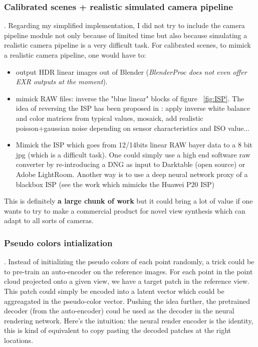 \subsubsection*{Calibrated scenes + realistic simulated camera pipeline}.
\noindent Regarding my simplified implementation, I did not try to include the camera pipeline module not only because of limited time but also because simulating a realistic camera pipeline is a very difficult task.
For calibrated scenes, to mimick a realistic camera pipeline, one would have to:
\begin{itemize}
    \item output HDR linear images out of Blender (\textit{BlenderProc does not even offer EXR outputs at the moment}).
    \item mimick RAW files: inverse the "blue linear" blocks of figure ~\cref*{fig:ISP}. The idea of reversing the ISP has been proposed in \cite{brooks2018unprocessing}: apply inverse white balance and color matrices from typical values, mosaick, add realistic poisson+gaussian noise depending on sensor characteristics and ISO value...
    \item Mimick the ISP which goes from 12/14bits linear RAW bayer data to a 8 bit jpg (which is a difficult task). One could simply use a high end software raw converter by re-introducing a DNG as input to Darktable (open source) or Adobe LightRoom. Another way is to use a deep neural network proxy of a blackbox ISP (see the work \cite{ignatov2020replacing} which mimicks the Huawei P20 ISP)
\end{itemize}
This is definitely \textbf{a large chunk of work} but it could bring a lot of value if one wants to try to make a commercial product for novel view synthesis which can adapt to all sorts of cameras.

\subsubsection*{Pseudo colors intialization}.
Instead of initializing the pseudo colors of each point randomly, a trick could be to pre-train an auto-encoder on the reference images. For each point in the point cloud projected onto a given view, we have a target patch in the reference view. This patch could simply be encoded into a latent vector which could be aggreagated in the pseudo-color vector. Pushing the idea further, the pretrained decoder (from the auto-encoder) coud be used as the decoder in the neural rendering network. Here's the intuition: the neural render encoder is the identity, this is kind of equivalent to copy pasting the decoded patches at the right locations.



